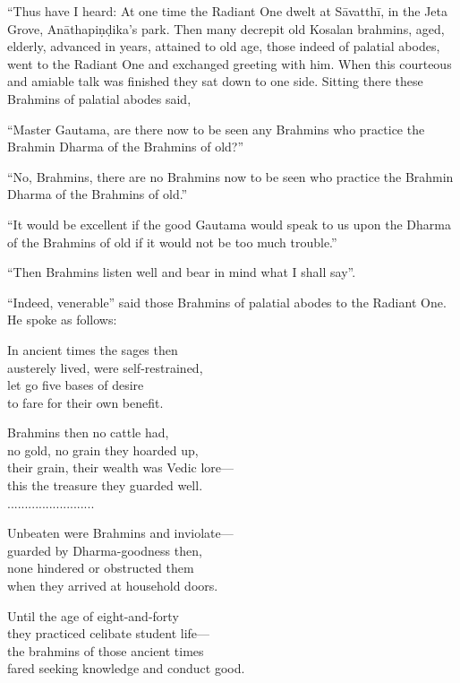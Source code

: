 \begin{myquote}
“Thus have I heard: At one time the Radiant One dwelt at Sāvatthī, in the Jeta Grove, Anāthapiṇḍika’s park. Then many decrepit old Kosalan brahmins, aged, elderly, advanced in years, attained to old age, those indeed of palatial abodes, went to the Radiant One and exchanged greeting with him. When this courteous and amiable talk was finished they sat down to one side. Sitting there these Brahmins of palatial abodes said,

“Master Gautama, are there now to be seen any Brahmins who practice the Brahmin Dharma of the Brahmins of old?”

“No, Brahmins, there are no Brahmins now to be seen who practice the Brahmin Dharma of the Brahmins of old.”

“It would be excellent if the good Gautama would speak to us upon the Dharma of the Brahmins of old if it would not be too much trouble.”

“Then Brahmins listen well and bear in mind what I shall say”.

“Indeed, venerable” said those Brahmins of palatial abodes to the Radiant One. He spoke as follows:

In ancient times the sages then\\ austerely lived, were self-restrained,\\ let go five bases of desire\\ to fare for their own benefit.

\vspace{0.05cm}

Brahmins then no cattle had,\\ no gold, no grain they hoarded up,\\ their grain, their wealth was Vedic lore—\\ this the treasure they guarded well.\\.........................


\vspace{0.05cm}


Unbeaten were Brahmins and inviolate—\\ guarded by Dharma-goodness then,\\ none hindered or obstructed them\\ when they arrived at household doors.

\vspace{0.05cm}

Until the age of eight-and-forty\\ they practiced celibate student life—\\ the brahmins of those ancient times\\ fared seeking knowledge and conduct good.


\end{myquote}
